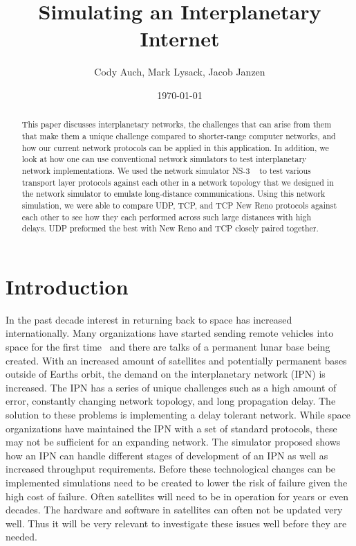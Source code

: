 \documentclass[a4paper,12pt]{article}
\title{Simulating an Interplanetary Internet}
\author{Cody Auch, Mark Lysack, Jacob Janzen}
\date{\today}
\begin{document}
\maketitle

\begin{abstract}
  This paper discusses interplanetary networks, the challenges that can arise
  from them that make them a unique challenge compared to shorter-range computer
  networks, and how our current network protocols can be applied in this
  application. In addition, we look at how one can use conventional network
  simulators to test interplanetary network implementations. We used the network
  simulator NS-3 ~\cite{ns-3} to test various transport layer protocols against
  each other in a network topology that we designed in the network simulator to
  emulate long-distance communications. Using this network simulation, we were
  able to compare UDP, TCP, and TCP New Reno protocols against each other to see
  how they each performed across such large distances with high delays. UDP
  preformed the best with New Reno and TCP closely paired together.
\end{abstract}

\section{Introduction}

In the past decade interest in returning back to space has increased
internationally. Many organizations have started sending remote vehicles into
space for the first time~%
and there are talks of a permanent lunar base being created. With an increased
amount of satellites and potentially permanent bases outside of Earths orbit,
the demand on the interplanetary network (IPN) is increased. The IPN has a
series of unique challenges such as a high amount of error, constantly changing
network topology, and long propagation delay. The solution to these problems is
implementing a delay tolerant network. While space organizations have maintained
the IPN with a set of standard protocols, these may not be sufficient for an
expanding network. The simulator proposed shows how an IPN can handle different
stages of development of an IPN as well as increased throughput requirements.
Before these technological changes can be implemented simulations need to be
created to lower the risk of failure given the high cost of failure. Often
satellites will need to be in operation for years or even decades. The hardware
and software in satellites can often not be updated very well. Thus it will be
very relevant to investigate these issues well before they are needed.
\end{document}
